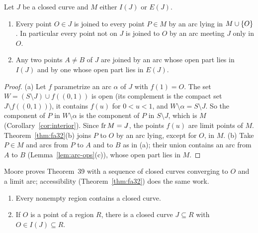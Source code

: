 \begin{theorem}\label{thm:fa39-40}
Let $J$ be a closed curve and $M$ either $I(J)$ or $E(J)$.
\begin{enumerate}[label=(\alph*)]
\item Every point $O\in J$ is joined to every point $P\in M$ by an arc lying in $M\cup\left\{ O \right\}$. In particular every point not on
$J$ is joined to $O$ by an arc meeting $J$ only in $O$.
\item Any two points $A\ne B$ of $J$ are joined by an arc whose open part lies in $I(J)$ and by one whose open part lies in
$E(J)$.
\end{enumerate}
\end{theorem}

\begin{proof}
(a) Let $f$ parametrize an arc $\alpha$ of $J$ with $f(1)=O$. The set $W=(S\setminus J)\cup f((0,1))$ is open (its
complement is the compact set $J\setminus f((0,1))$), it contains $f(u)$ for $0<u<1$, and $W\setminus\alpha=S\setminus J$. So the
component of $P$ in $W\setminus\alpha$ is the component of $P$ in $S\setminus J$, which is $M$ (Corollary~\ref{cor:interior}).
Since $\operatorname{fr} M=J$, the points $f(u)$ are limit points of $M$. Theorem~\ref{thm:fa32}(b) joins $P$ to $O$ by an arc lying, except for
$O$, in $M$.
(b) Take $P\in M$ and arcs from $P$ to $A$ and to $B$ as in (a); their union contains an arc from $A$ to $B$
(Lemma~\ref{lem:arc-ops}(c)), whose open part lies in $M$.
\end{proof}


Moore proves Theorem~39 with a sequence of closed curves converging to $O$ and a limit arc; accessibility
(Theorem~\ref{thm:fa32}) does the same work.

\begin{theorem}\label{thm:fa35-36}
\leavevmode
\begin{enumerate}[label=(\alph*)]
\item Every nonempty region contains a closed curve.
\item If $O$ is a point of a region $R$, there is a closed curve $J\subseteq R$ with $O\in I(J)\subseteq R$.
\end{enumerate}
\end{theorem}

